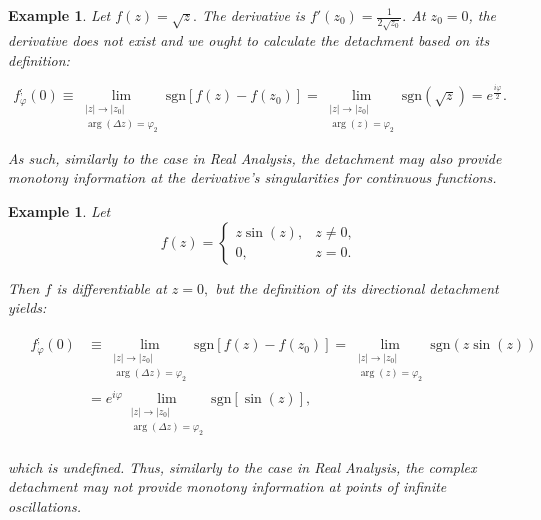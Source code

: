 \documentclass[11pt]{book}
\newtheorem{exm}[thm]{Example}
\begin{document}
\begin{exm}Let $f\left(z\right)=\sqrt{z}.$ The derivative is $f'\left(z_{0}\right)=\frac{1}{2\sqrt{z_{0}}}.$ At $z_{0}=0$, the derivative does not exist and we ought to calculate the detachment based on its definition:

$$f_{\varphi}^{;}\left(0\right)\equiv\underset{\begin{array}{c}
\left|z\right|\to\left|z_{0}\right|\\
\arg\left(\Delta z\right)=\varphi_{2}
\end{array}}{\lim}\text{sgn}\left[f\left(z\right)-f\left(z_{0}\right)\right]=\underset{\begin{array}{c}
\left|z\right|\to\left|z_{0}\right|\\
\arg\left(z\right)=\varphi_{2}
\end{array}}{\lim}\text{sgn}\left(\sqrt{z}\right)=e^{\frac{i\varphi}{2}}.$$

As such, similarly to the case in Real Analysis, the detachment may also provide monotony information at the derivative's singularities for continuous functions.
\end{exm}

\begin{exm}Let $$f\left(z\right)=\begin{cases}
z\sin\left(z\right), & z\neq0,\\
0, & z=0.
\end{cases}$$

Then $f$ is differentiable at $z=0,$ but the definition of its directional detachment yields:

\begin{align}
&\begin{aligned}
f_{\varphi}^{;}\left(0\right)&\equiv\underset{\begin{array}{c}
\left|z\right|\to\left|z_{0}\right|\\
\arg\left(\Delta z\right)=\varphi_{2}
\end{array}}{\lim}\text{sgn}\left[f\left(z\right)-f\left(z_{0}\right)\right]=\underset{\begin{array}{c}
\left|z\right|\to\left|z_{0}\right|\\
\arg\left(z\right)=\varphi_{2}
\end{array}}{\lim}\text{sgn}\left(z\sin\left(z\right)\right) \\
&=e^{i\varphi}\underset{\begin{array}{c}
\left|z\right|\to\left|z_{0}\right|\\
\arg\left(\Delta z\right)=\varphi_{2}
\end{array}}{\lim}\text{sgn}\left[\sin\left(z\right)\right],
\end{aligned}
\end{align}

which is undefined. Thus, similarly to the case in Real Analysis, the complex detachment may not provide monotony information at points of infinite oscillations.
\end{exm}
\end{document}
